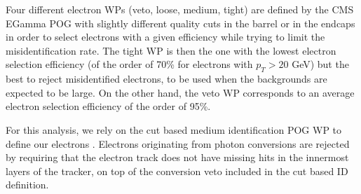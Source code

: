 \documentclass[a4paper, 10pt, openright]{report}
\begin{document}

Four different electron \acp{WP} (veto, loose, medium, tight) are defined by the \ac{CMS} EGamma \ac{POG} \cite{ElePOG} with slightly different quality cuts in the barrel or in the endcaps in order to select electrons with a given efficiency while trying to limit the misidentification rate. The tight \ac{WP} is then the one with the lowest electron selection efficiency (of the order of 70\% for electrons with $p_T > 20$ GeV) but the best to reject misidentified electrons, to be used when the backgrounds are expected to be large. On the other hand, the veto \ac{WP} corresponds to an average electron selection efficiency of the order of 95\%. 

For this analysis, we rely on the cut based medium identification \ac{POG} \ac{WP} to define our electrons \cite{EleWPs}. Electrons originating from photon conversions are rejected by requiring that the electron track does not have missing hits in the innermost layers of the tracker, on top of the conversion veto included in the cut based ID definition.
\end{document}
